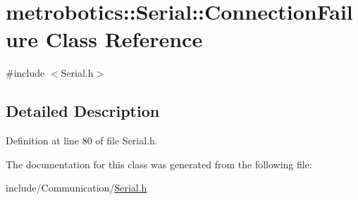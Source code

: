 \hypertarget{classmetrobotics_1_1Serial_1_1ConnectionFailure}{\section{metrobotics\-:\-:\-Serial\-:\-:\-Connection\-Failure \-Class \-Reference}
\label{classmetrobotics_1_1Serial_1_1ConnectionFailure}
}


{\ttfamily \#include $<$\-Serial.\-h$>$}



\subsection{\-Detailed \-Description}


\-Definition at line 80 of file \-Serial.\-h.



\-The documentation for this class was generated from the following file\-:\begin{DoxyCompactItemize}
\item 
include/\-Communication/\hyperlink{Serial_8h}{\-Serial.\-h}\end{DoxyCompactItemize}
